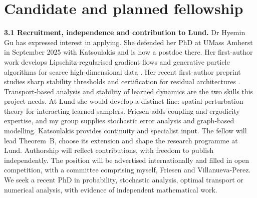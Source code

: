 \documentclass[12pt,a4paper]{article}
\begin{document}
\section{Candidate and planned fellowship}
\textbf{3.1 Recruitment, independence and contribution to Lund.}
Dr Hyemin Gu has expressed interest in applying. She defended her PhD at UMass Amherst in September 2025 with Katsoulakis and is now a postdoc there. Her first-author work develops Lipschitz-regularised gradient flows and generative particle algorithms for scarce high-dimensional data \cite{GBPRK24}. Her recent first-author preprint studies sharp stability thresholds and certification for residual architectures \cite{GTSK26}. Transport-based analysis and stability of learned dynamics are the two skills this project needs. At Lund she would develop a distinct line: spatial perturbation theory for interacting learned samplers. Friesen adds coupling and ergodicity expertise, and my group supplies stochastic error analysis and graph-based modelling. Katsoulakis provides continuity and specialist input. The fellow will lead Theorem~B, choose its extension and shape the research programme at Lund. Authorship will reflect contributions, with freedom to publish independently. The position will be advertised internationally and filled in open competition, with a committee comprising myself, Friesen and Villanueva-Perez. We seek a recent PhD in probability, stochastic analysis, optimal transport or numerical analysis, with evidence of independent mathematical work.
\end{document}
